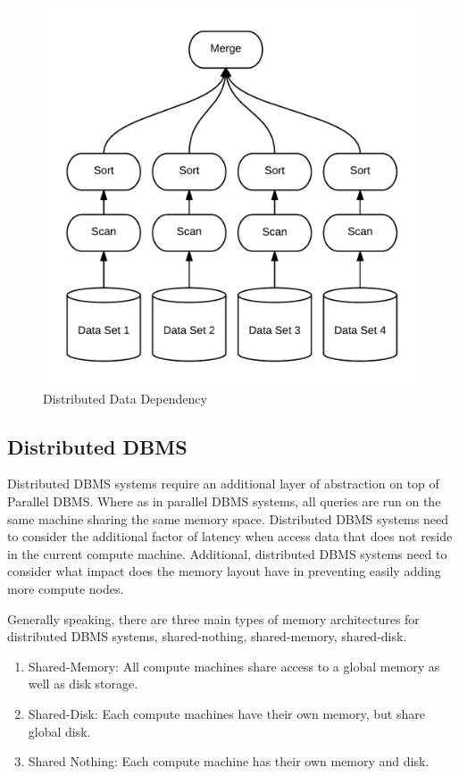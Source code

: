 \documentclass[10pt,twocolumn]{IEEEtran11}
\begin{document}
\begin{figure}[h]
\centering
\includegraphics[scale=0.12]{images/parDBMS.png}
\caption{Distributed Data Dependency}
\label{fig:disDBMS}
\end{figure}

\subsection{Distributed DBMS}

Distributed DBMS systems require an additional layer of abstraction on top of Parallel DBMS.  Where as in parallel DBMS systems, all queries are run on the same machine sharing the same memory space.  Distributed DBMS systems need to consider the additional factor of latency when access data that does not reside in the current compute machine.  Additional, distributed DBMS systems need to consider what impact does the memory layout have in preventing easily adding more compute nodes.  

Generally speaking, there are three main types of memory 
architectures for distributed DBMS systems, shared-nothing, shared-memory, shared-disk.
\  \\
\begin{enumerate}
\setlength\itemsep{1em}
\item Shared-Memory: All compute machines share access to a global memory as well as disk storage.  
\item Shared-Disk: Each compute machines have their own memory, but share global disk.
\item Shared Nothing: Each compute machine has their own memory and disk. 
\end{enumerate}
\end{document}
